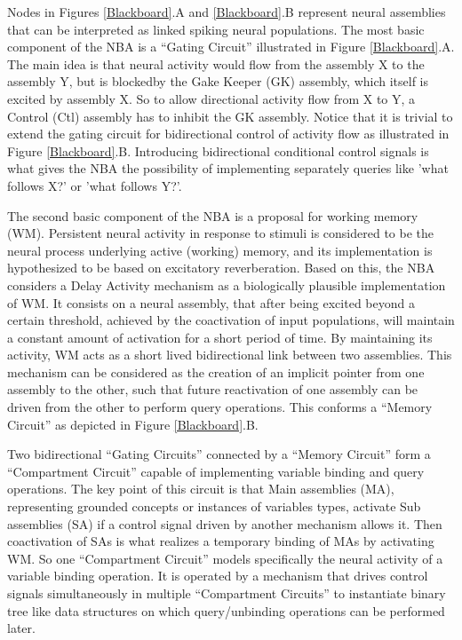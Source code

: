 \documentclass[10pt]{article}
\begin{document}
Nodes in Figures {\ref{Blackboard}}.A and {\ref{Blackboard}}.B represent neural assemblies that can be interpreted as linked spiking neural populations.
The most basic component of the NBA is a ``Gating Circuit'' illustrated in Figure {\ref{Blackboard}}.A.
The main idea is that neural activity would flow from the assembly X to the assembly Y, but is blockedby the Gake Keeper (GK) assembly, 
which itself is excited by assembly X.
So to allow directional activity flow from X to Y, a Control (Ctl) assembly has to inhibit the GK assembly.
Notice that it is trivial to extend the gating circuit for bidirectional control of activity flow as illustrated in Figure {\ref{Blackboard}}.B.
Introducing bidirectional conditional control signals is what gives the NBA the possibility of implementing separately queries like 'what follows X?' or 'what follows Y?'.

The second basic component of the NBA is a proposal for working memory (WM).
Persistent neural activity in response to stimuli is considered to be the neural process underlying active (working) memory, and its implementation is hypothesized to be based on excitatory reverberation\cite{wang2001synaptic}.
Based on this, the NBA considers a Delay Activity\cite{de_Kamps_2005} mechanism as a biologically plausible implementation of WM. It consists on a neural assembly, that after being excited beyond a certain threshold, achieved by the coactivation of input populations, will maintain a constant amount of activation for a short period of time. By maintaining its activity, WM acts as a short lived bidirectional link between two assemblies. This mechanism can be considered as the creation of an implicit pointer from one assembly to the other, such that future reactivation of one assembly can be driven from the other to perform query operations. This conforms a ``Memory Circuit'' as depicted in Figure {\ref{Blackboard}}.B.

Two bidirectional ``Gating Circuits'' connected by a ``Memory Circuit'' form a ``Compartment Circuit'' capable of implementing variable binding and query operations.
The key point of this circuit is that Main assemblies (MA), representing grounded concepts or instances of variables types, activate Sub assemblies (SA) 
if a control signal driven by another mechanism allows it.
Then coactivation of SAs is what realizes a temporary binding of MAs by activating WM.
So one ``Compartment Circuit'' models specifically the neural activity of a variable binding operation.
It is operated by a mechanism that drives control signals simultaneously in multiple ``Compartment Circuits'' to instantiate binary tree like data structures on which query/unbinding operations can be performed later. 
\end{document}
